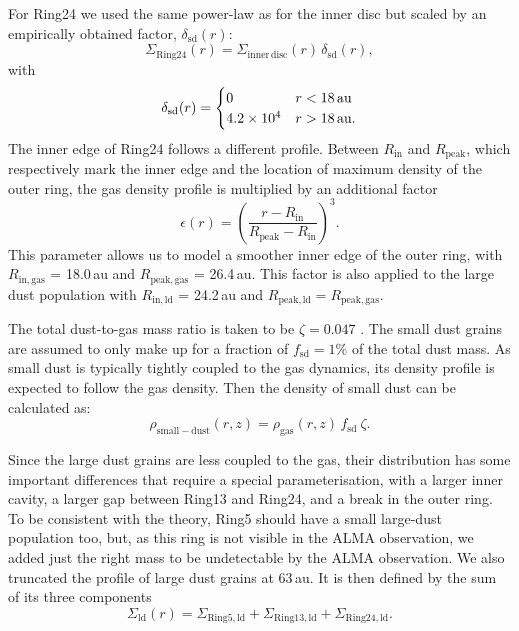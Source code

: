 \documentclass[usenatbib,times]{mnras}
\begin{document}
For Ring24 we used the same power-law as for the inner disc but scaled by an empirically obtained factor, $\delta_{\mathrm{sd}}(r)$:
\begin{equation}
  \Sigma_{\mathrm{Ring24}}(r) = \Sigma_{\mathrm{inner\,disc}}(r)\, \delta_{\mathrm{sd}}(r),
\end{equation}
with
\begin{equation}
  \delta_{\mathrm{sd}}(r) =
  \begin{cases}
  0    & r < 18\text{\,au} \\
  4.2\times 10^4 & r > 18\text{\,au}.
  \end{cases}
\end{equation}
The inner edge of Ring24 follows a different profile. Between $R_\mathrm{in}$ and $R_\mathrm{peak}$, which respectively mark  the inner edge and the location of maximum density of the outer ring, the gas density profile is multiplied by an additional factor
\begin{equation}
    \epsilon(r) = \left(\frac{ r - R_\mathrm{in}}{R_\mathrm{peak} - R_\mathrm{in}}\right)^3.
\end{equation}
This parameter allows us to model a smoother inner edge of the outer ring, with $R_\mathrm{in,gas}$ = 18.0\,au and $R_\mathrm{peak,gas}$ = 26.4\,au. This factor is also applied to the large dust population with $R_\mathrm{in,ld}$ = 24.2\,au and $R_\mathrm{peak,ld} = R_\mathrm{peak,gas}$. 

The total dust-to-gas mass ratio is taken to be $\zeta = 0.047$ \citep[as in][]{Rosenfeld_2013}. The small dust grains are assumed to only make up for a fraction of $f_\mathrm{sd}=1\%$ of the total dust mass. As small dust is typically tightly coupled to the gas dynamics, its density profile is expected to follow the gas density. Then the density of small dust can be calculated as:
\begin{equation}
\rho_{\mathrm{small-dust}}(r,z)=\rho_{\mathrm{gas}}(r,z)\, f_{\mathrm{sd}} \: \zeta .
\end{equation}

Since the large dust grains are less coupled to the gas, their distribution has some important differences that require a special parameterisation, with a larger inner cavity, a larger gap between Ring13 and Ring24, and a break in the outer ring. To be consistent with the theory, Ring5 should have a small large-dust population too, but, as this ring is not visible in the ALMA observation, we added just the right mass to be undetectable by the ALMA observation. We also truncated the profile of large dust grains at 63\,au. It is then defined by the sum of its three components
\begin{equation}
  \Sigma_{\mathrm{ld}}(r) = \Sigma_{\mathrm{Ring5,ld}} + 
  \Sigma_{\mathrm{Ring13,ld}} + \Sigma_{\mathrm{Ring24,ld}}.
\end{equation}
\end{document}

